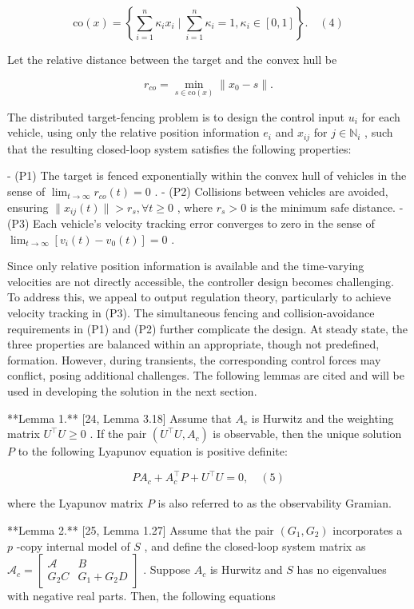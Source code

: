 $$\text{co}(x) = \left\{ \sum_{i=1}^n \kappa_i x_i \mid \sum_{i=1}^n \kappa_i = 1, \kappa_i \in [0, 1] \right\}. \quad (4)$$

Let the relative distance between the target and the convex hull be

$$r_{co} = \min_{s \in \text{co}(x)} \|x_0 - s\|.$$

The distributed target-fencing problem is to design the control input  $u_i$  for each vehicle, using only the relative position information  $e_i$  and  $x_{ij}$  for  $j \in \mathbb{N}_i$ , such that the resulting closed-loop system satisfies the following properties:

- (P1) The target is fenced exponentially within the convex hull of vehicles in the sense of  $\lim_{t \rightarrow \infty} r_{co}(t) = 0$ .
- (P2) Collisions between vehicles are avoided, ensuring  $\|x_{ij}(t)\| > r_s, \forall t \geq 0$ , where  $r_s > 0$  is the minimum safe distance.
- (P3) Each vehicle's velocity tracking error converges to zero in the sense of  $\lim_{t \rightarrow \infty} [v_i(t) - v_0(t)] = 0$ .

Since only relative position information is available and the time-varying velocities are not directly accessible, the controller design becomes challenging. To address this, we appeal to output regulation theory, particularly to achieve velocity tracking in (P3). The simultaneous fencing and collision-avoidance requirements in (P1) and (P2) further complicate the design. At steady state, the three properties are balanced within an appropriate, though not predefined, formation. However, during transients, the corresponding control forces may conflict, posing additional challenges. The following lemmas are cited and will be used in developing the solution in the next section.

**Lemma 1.** [24, Lemma 3.18] Assume that  $A_c$  is Hurwitz and the weighting matrix  $U^\top U \geq 0$ . If the pair  $(U^\top U, A_c)$  is observable, then the unique solution  $P$  to the following Lyapunov equation is positive definite:

$$P A_c + A_c^\top P + U^\top U = 0, \quad (5)$$

where the Lyapunov matrix  $P$  is also referred to as the observability Gramian.

**Lemma 2.** [25, Lemma 1.27] Assume that the pair  $(G_1, G_2)$  incorporates a  $p$ -copy internal model of  $S$ , and define the closed-loop system matrix as  $\mathcal{A}_c = \begin{bmatrix} \mathcal{A} & B \\ G_2 C & G_1 + G_2 D \end{bmatrix}$ . Suppose  $A_c$  is Hurwitz and  $S$  has no eigenvalues with negative real parts. Then, the following equations

